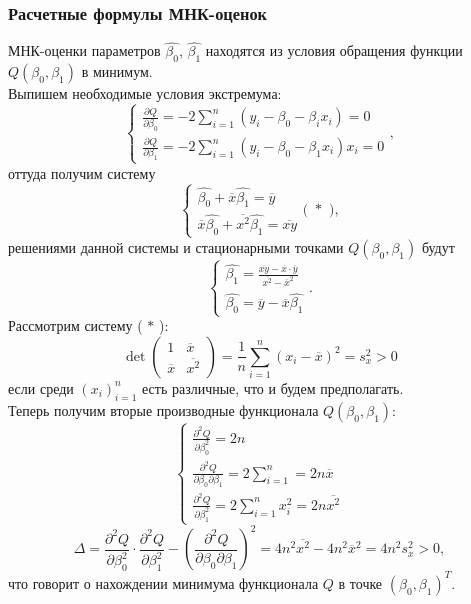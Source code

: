 \documentclass[14pt]{extarticle}
\begin{document}
\subsubsection{Расчетные формулы МНК-оценок}
МНК-оценки параметров \(\widehat{\beta_0}\), \(\widehat{\beta_1}\) находятся из условия обращения функции \(Q(\beta_0, \beta_1)\) в минимум.\\
Выпишем необходимые условия экстремума: \[
\begin{cases} 
    \frac{\partial Q}{\partial\beta_0}=-2\sum\limits_{i=1}^n(y_i-\beta_0-\beta_ix_i)=0 \\
    \frac{\partial Q}{\partial\beta_1}=-2\sum\limits_{i=1}^n(y_i-\beta_0-\beta_1x_i)x_i=0
\end{cases},
\] оттуда получим систему \[
\begin{cases} 
    \widehat{\beta_0}+\overline{x}\widehat{\beta_1}=\overline{y}\\
    \overline{x}\widehat{\beta_0}+\overline{x^2}\widehat{\beta_1}=\overline{xy}
\end{cases} \text{( }\ast\text{ )},
\]решениями данной системы и стационарными точками \(Q(\beta_0, \beta_1)\) будут \[
\begin{cases} 
    \widehat{\beta_1}=\frac{\overline{xy}-\overline{x}\cdot\overline{y}}{\overline{x^2}-\overline{x}^2} \\
    \widehat{\beta_0}=\overline{y}-\overline{x}\widehat{\beta_1}
\end{cases}.
\] Рассмотрим систему ( \(\ast\) ): \[\det{
\begin{pmatrix}
    1 & \overline{x}\\
    \overline{x} & \overline{x^2}
\end{pmatrix}
}=\frac{1}{n}\sum\limits_{i=1}^n(x_i-\overline{x})^2=s_x^2>0\] если среди \((x_i)_{i=1}^n\) есть различные, что и будем предполагать.\\
Теперь получим вторые производные функционала \(Q(\beta_0, \beta_1)\): \[
\begin{cases}
    \frac{\partial^2Q}{\partial\beta_0^2}=2n \\
    \frac{\partial^2 Q}{\partial\beta_0\partial\beta_1}=2\sum\limits_{i=1}^n=2n\overline{x} \\
    \frac{\partial^2Q}{\partial\beta_1^2}=2\sum\limits_{i=1}^nx_i^2=2n\overline{x^2}
\end{cases}
\] \[\Delta=\frac{\partial^2Q}{\partial\beta_0^2}\cdot\frac{\partial^2Q}{\partial\beta_1^2}-(\frac{\partial^2 Q}{\partial\beta_0\partial\beta_1})^2=4n^2\overline{x^2}-4n^2\overline{x}^2=4n^2s_x^2>0,\] что говорит о нахождении минимума функционала \(Q\) в точке \((\beta_0, \beta_1)^T\).
\end{document}
